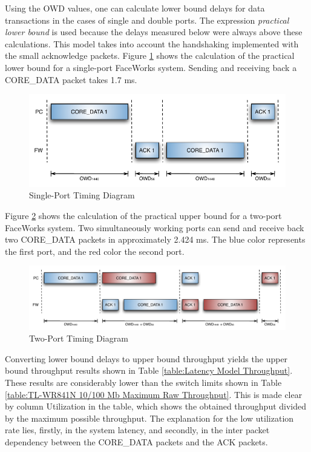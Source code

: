 \documentclass[defaultstyle,10pt,master,Helvetica]{thesis}
\begin{document}



Using the OWD values, one can calculate lower bound delays for data transactions in the cases of single and double ports. The expression  {\it practical lower bound} is used because the delays measured below were always above these calculations.  This model takes into account the handshaking implemented
with the small acknowledge packets. Figure \ref{fig:singleport} shows the calculation of the practical lower bound for a single-port FaceWorks system. Sending and receiving back a CORE\_DATA packet takes 1.7 ms.

\begin{figure}[h]
  \centering
      \includegraphics[scale=1,center]{Diagrams/Single-time.pdf}
  \caption{Single-Port Timing Diagram}\label{fig:singleport}
\end{figure}

Figure \ref{fig:dualport} shows the calculation of the practical upper bound for a two-port FaceWorks system. Two simultaneously working ports can send and receive back two CORE\_DATA packets in approximately 2.424 ms. The blue color represents the first port, and the red color the second port.

\begin{figure}[h]
  \centering
      \includegraphics[scale=1,center]{Diagrams/Dual-time.pdf}
  \caption{Two-Port Timing Diagram}\label{fig:dualport}
\end{figure}




Converting lower bound delays to upper bound throughput yields the upper bound throughput results shown in Table \ref{table:Latency Model Throughput}. These results are considerably lower than the switch limits shown in Table \ref{table:TL-WR841N 10/100 Mb Maximum Raw Throughput}. This is made clear by column Utilization in the table, which shows the obtained throughput divided by the maximum possible throughput.  The explanation for the low utilization rate lies, firstly, in the system latency, and secondly, in the inter packet dependency between the CORE\_DATA packets and the ACK packets.
\end{document}

